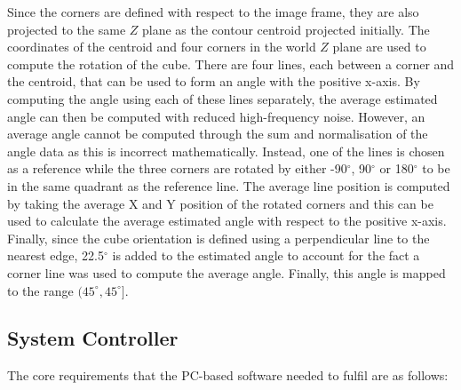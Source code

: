 Since the corners are defined with respect to the image frame, they are also projected to the same $Z$ plane as the contour centroid projected initially. The coordinates of the centroid and four corners in the world $Z$ plane are used to compute the rotation of the cube. There are four lines, each between a corner and the centroid, that can be used to form an angle with the positive x-axis. By computing the angle using each of these lines separately, the average estimated angle can then be computed with reduced high-frequency noise. However, an average angle cannot be computed through the sum and normalisation of the angle data as this is incorrect mathematically. Instead, one of the lines is chosen as a reference while the three corners are rotated by either -90$^{\circ}$,  90$^{\circ}$ or  180$^{\circ}$ to be in the same quadrant as the reference line. The average line position is computed by taking the average X and Y position of the rotated corners and this can be used to calculate the average estimated angle with respect to the positive x-axis. Finally, since the cube orientation is defined using a perpendicular line to the nearest edge, 22.5$^{\circ}$ is added to the estimated angle to account for the fact a corner line was used to compute the average angle. Finally, this angle is mapped to the range $(45^{\circ},45^{\circ}]$.


\subsection{System Controller}

The core requirements that the PC-based software needed to fulfil are as follows:


